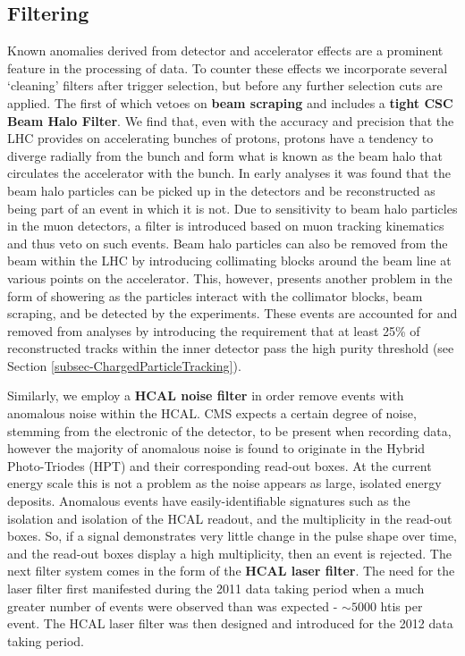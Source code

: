 \subsection{Filtering}

Known anomalies derived from detector and accelerator effects are a prominent feature in the processing of data. To counter these effects we incorporate several `cleaning' filters after trigger selection, but before any further selection cuts are applied. The first of which vetoes on \textbf{beam scraping} and includes a \textbf{tight CSC Beam Halo Filter}. We find that, even with the accuracy and precision that the LHC provides on accelerating bunches of protons, protons have a tendency to diverge radially from the bunch and form what is known as the beam halo that circulates the accelerator with the bunch. In early analyses it was found that the beam halo particles can be picked up in the detectors and be reconstructed as being part of an event in which it is not. Due to sensitivity to beam halo particles in the muon detectors, a filter is introduced based on muon tracking kinematics and thus veto on such events. Beam halo particles can also be removed from the beam within the LHC by introducing collimating blocks around the beam line at various points on the accelerator. This, however, presents another problem in the form of showering as the particles interact with the collimator blocks, beam scraping, and be detected by the experiments. These events are accounted for and removed from analyses by introducing the requirement that at least 25\% of reconstructed tracks within the inner detector pass the high purity threshold (see Section \ref{subsec-ChargedParticleTracking}). 

Similarly, we employ a \textbf{HCAL noise filter} in order remove events with anomalous noise within the HCAL. CMS expects a certain degree of noise, stemming from the electronic of the detector, to be present when recording data, however the majority of anomalous noise is found to originate in the Hybrid Photo-Triodes (HPT) and their corresponding read-out boxes. At the current energy scale this is not a problem as the noise appears as large, isolated energy deposits. Anomalous events have easily-identifiable signatures such as the isolation and isolation of the HCAL readout, and the multiplicity in the read-out boxes. So, if a signal demonstrates very little change in the pulse shape over time, and the read-out boxes display a high multiplicity, then an event is rejected. The next filter system comes in the form of the \textbf{HCAL laser filter}. The need for the laser filter first manifested during the 2011 data taking period when a much greater number of events were observed than was expected - $\sim5000$ htis per event. The HCAL laser filter was then designed and introduced for the 2012 data taking period.  

